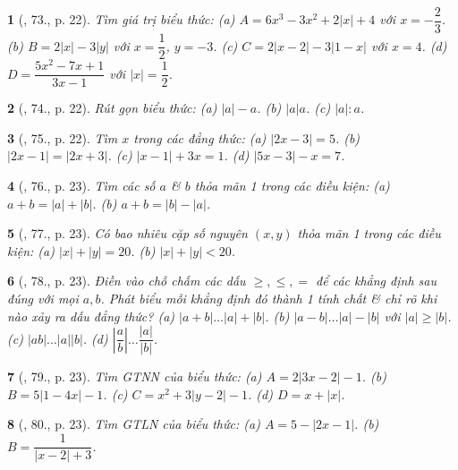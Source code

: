 \documentclass{article}
\newtheorem{baitoan}{}
\begin{document}
\begin{baitoan}[\cite{Binh_Toan_7_tap_1}, 73., p. 22]
	Tìm giá trị biểu thức: (a) $A = 6x^3 - 3x^2 + 2|x| + 4$ với $x = -\dfrac{2}{3}$. (b) $B = 2|x| - 3|y|$ với $x = \dfrac{1}{2}$, $y = -3$. (c) $C = 2|x - 2| - 3|1 - x|$ với $x = 4$. (d) $D = \dfrac{5x^2 - 7x + 1}{3x - 1}$ với $|x| = \dfrac{1}{2}$.	
\end{baitoan}

\begin{baitoan}[\cite{Binh_Toan_7_tap_1}, 74., p. 22]
	Rút gọn biểu thức: (a) $|a| - a$. (b) $|a|a$. (c) $|a|:a$.	
\end{baitoan}

\begin{baitoan}[\cite{Binh_Toan_7_tap_1}, 75., p. 22]
	Tìm $x$ trong các đẳng thức: (a) $|2x - 3| = 5$. (b) $|2x - 1| = |2x + 3|$. (c) $|x - 1| + 3x = 1$. (d) $|5x - 3| - x = 7$.	
\end{baitoan}

\begin{baitoan}[\cite{Binh_Toan_7_tap_1}, 76., p. 23]
	Tìm các số $a$ \& $b$ thỏa mãn 1 trong các điều kiện: (a) $a + b = |a| + |b|$. (b) $a + b = |b| - |a|$.	
\end{baitoan}

\begin{baitoan}[\cite{Binh_Toan_7_tap_1}, 77., p. 23]
	Có bao nhiêu cặp số nguyên $(x,y)$ thỏa mãn 1 trong các điều kiện: (a) $|x| + |y| = 20$. (b) $|x| + |y| < 20$.	
\end{baitoan}

\begin{baitoan}[\cite{Binh_Toan_7_tap_1}, 78., p. 23]
	Điền vào chỗ chấm các dấu $\ge,\le,=$ để các khẳng định sau đúng với mọi $a,b$. Phát biểu mỗi khẳng định đó thành 1 tính chất \& chỉ rõ khi nào xảy ra dấu đẳng thức? (a) $|a + b|\ldots|a| + |b|$. (b) $|a - b|\ldots|a| - |b|$ với $|a|\ge|b|$. (c) $|ab|\ldots|a||b|$. (d) $\left|\dfrac{a}{b}\right|\ldots\dfrac{|a|}{|b|}$.	
\end{baitoan}

\begin{baitoan}[\cite{Binh_Toan_7_tap_1}, 79., p. 23]
	Tìm {\rm GTNN} của biểu thức: (a) $A = 2|3x - 2| - 1$. (b) $B = 5|1 - 4x| - 1$. (c) $C = x^2 + 3|y - 2| - 1$. (d) $D = x + |x|$.	
\end{baitoan}

\begin{baitoan}[\cite{Binh_Toan_7_tap_1}, 80., p. 23]
	Tìm {\rm GTLN} của biểu thức: (a) $A = 5 - |2x - 1|$. (b) $B = \dfrac{1}{|x - 2| + 3}$.	
\end{baitoan}
\end{document}
